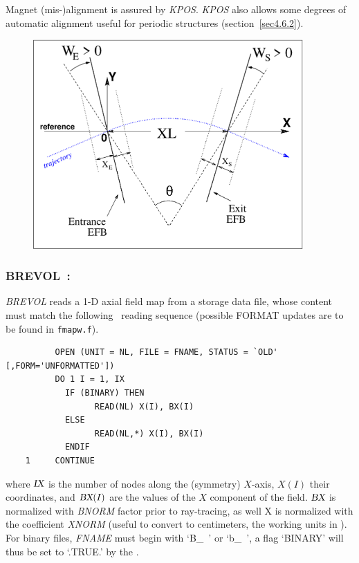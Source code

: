 \bigskip

\noindent Magnet (mis-)alignment is assured by \textsl{KPOS}. 
\textsl{KPOS} also  allows some degrees of automatic alignment useful for periodic structures (section~\ref{sec4.6.2}).

\vfill
\begin{figure}[H]
  \centerline{\includegraphics[height=8cm]{Fig14.eps}}
  {\setlength{\captionwidth}{12cm}
	\hangcaption[Fig14]{\label{fig14}
               \CapBEND
    } }
\end{figure}

\vfill
\newpage


\subsubsection*{BREVOL~: \BREVOLTitl} \label{BREVOL}
\medskip

\textsl{BREVOL}  reads a 1-D axial field map from a storage data file,
whose content must match the following \FORTRAN\ reading sequence (possible FORMAT updates are to be found in \texttt{fmapw.f}).   

\bigskip


{\footnotesize
\begin{verbatim}
	      OPEN (UNIT = NL, FILE = FNAME, STATUS = `OLD' [,FORM='UNFORMATTED'])
	      DO 1 I = 1, IX
	        IF (BINARY) THEN 
	              READ(NL) X(I), BX(I)
	        ELSE
	              READ(NL,*) X(I), BX(I)
	        ENDIF
	1     CONTINUE
\end{verbatim}}
\medskip

\noindent where $\textsl{IX}$ is the number of nodes along the (symmetry) $X$-axis, $X(I)$
their coordinates, and $\textsl{BX}(I)$ are the values of the $X$ component of the field. $\textsl{BX}$ is 
normalized with \textsl{BNORM} factor prior to ray-tracing, as well  X is normalized with 
 the coefficient  \textsl{XNORM}  (useful to convert to centimeters, the working units in  \zgoubi). 
For binary files, \textsl{FNAME} must begin with \mbox{`B\_ '} or  \mbox{`b\_ '}, 
a flag `BINARY' will thus be set to `.TRUE.' by the \FORTRAN.  

